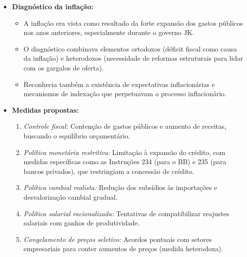 \documentclass[a4paper,12pt]{article}[abntex2]
\begin{document}
\begin{itemize}
    \item \textbf{Diagnóstico da inflação:}
    \begin{itemize}
        \item A inflação era vista como resultado da forte expansão dos gastos públicos nos anos anteriores, especialmente durante o governo JK.
        \item O diagnóstico combinava elementos ortodoxos (déficit fiscal como causa da inflação) e heterodoxos (necessidade de reformas estruturais para lidar com os gargalos de oferta).
        \item Reconhecia também a existência de expectativas inflacionárias e mecanismos de indexação que perpetuavam o processo inflacionário.
    \end{itemize}

    \item \textbf{Medidas propostas:}
    \begin{enumerate}
        \item \textit{Controle fiscal:} Contenção de gastos públicos e aumento de receitas, buscando o equilíbrio orçamentário.
        \item \textit{Política monetária restritiva:} Limitação à expansão do crédito, com medidas específicas como as Instruções 234 (para o BB) e 235 (para bancos privados), que restringiam a concessão de crédito.
        \item \textit{Política cambial realista:} Redução dos subsídios às importações e desvalorização cambial gradual.
        \item \textit{Política salarial racionalizada:} Tentativas de compatibilizar reajustes salariais com ganhos de produtividade.
        \item \textit{Congelamento de preços seletivo:} Acordos pontuais com setores empresariais para conter aumentos de preços (medida heterodoxa).
    \end{enumerate}


\end{itemize}
\end{document}
